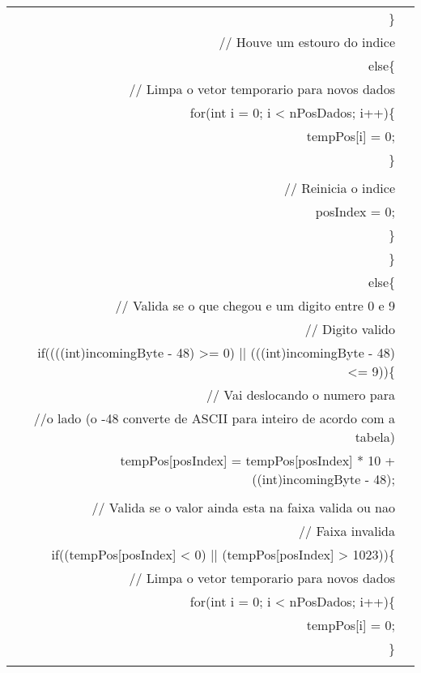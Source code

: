 \begin{longtable}{Rp{15cm}}
\qquad \qquad      \} \\
\qquad \qquad      // Houve um estouro do indice \\
\qquad \qquad      else\{ \\
\qquad \qquad \qquad        // Limpa o vetor temporario para novos dados \\
\qquad \qquad \qquad        for(int i = 0; i < nPosDados; i++)\{ \\
\qquad \qquad \qquad \qquad          tempPos[i] = 0; \\
\qquad \qquad \qquad        \} \\
\\
\qquad \qquad \qquad        // Reinicia o indice \\
\qquad \qquad \qquad        posIndex = 0; \\   
\qquad \qquad      \} \\
\qquad    \} \\
\qquad    else\{ \\
\qquad \qquad      // Valida se o que chegou e um digito entre 0 e 9 \\
\qquad \qquad      // Digito valido \\
\qquad \qquad      if((((int)incomingByte - 48) >= 0) || (((int)incomingByte - 48) <= 9))\{ \\
\qquad \qquad \qquad          // Vai deslocando o numero para \\
\qquad \qquad \qquad          //o lado (o -48 converte de ASCII para inteiro de acordo com a tabela) \\
\qquad \qquad \qquad          tempPos[posIndex] = tempPos[posIndex] * 10 + ((int)incomingByte - 48);   \\       
\\
\qquad \qquad \qquad          // Valida se o valor ainda esta na faixa valida ou nao \\
\qquad \qquad \qquad          // Faixa invalida \\
\qquad \qquad \qquad            if((tempPos[posIndex] < 0) || (tempPos[posIndex] > 1023))\{ \\
\qquad \qquad \qquad \qquad              // Limpa o vetor temporario para novos dados \\
\qquad \qquad \qquad \qquad              for(int i = 0; i < nPosDados; i++)\{ \\
\qquad \qquad \qquad \qquad \qquad                tempPos[i] = 0; \\
\qquad \qquad \qquad \qquad              \} \\
              \\

\end{longtable}
